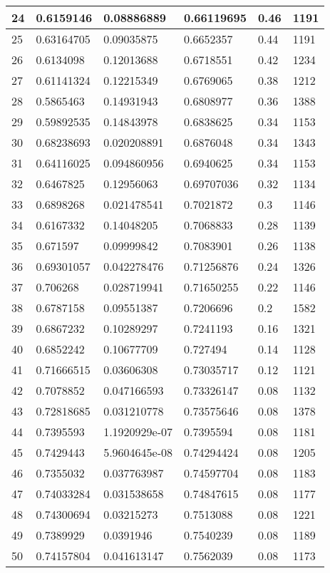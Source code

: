 \begin{longtable}{|l|l|l|l|l|l|}
24 & 0.6159146 & 0.08886889 & 0.66119695 & 0.46 & 1191 \\ \hline 
25 & 0.63164705 & 0.09035875 & 0.6652357 & 0.44 & 1191 \\ \hline 
26 & 0.6134098 & 0.12013688 & 0.6718551 & 0.42 & 1234 \\ \hline 
27 & 0.61141324 & 0.12215349 & 0.6769065 & 0.38 & 1212 \\ \hline 
28 & 0.5865463 & 0.14931943 & 0.6808977 & 0.36 & 1388 \\ \hline 
29 & 0.59892535 & 0.14843978 & 0.6838625 & 0.34 & 1153 \\ \hline 
30 & 0.68238693 & 0.020208891 & 0.6876048 & 0.34 & 1343 \\ \hline 
31 & 0.64116025 & 0.094860956 & 0.6940625 & 0.34 & 1153 \\ \hline 
32 & 0.6467825 & 0.12956063 & 0.69707036 & 0.32 & 1134 \\ \hline 
33 & 0.6898268 & 0.021478541 & 0.7021872 & 0.3 & 1146 \\ \hline 
34 & 0.6167332 & 0.14048205 & 0.7068833 & 0.28 & 1139 \\ \hline 
35 & 0.671597 & 0.09999842 & 0.7083901 & 0.26 & 1138 \\ \hline 
36 & 0.69301057 & 0.042278476 & 0.71256876 & 0.24 & 1326 \\ \hline 
37 & 0.706268 & 0.028719941 & 0.71650255 & 0.22 & 1146 \\ \hline 
38 & 0.6787158 & 0.09551387 & 0.7206696 & 0.2 & 1582 \\ \hline 
39 & 0.6867232 & 0.10289297 & 0.7241193 & 0.16 & 1321 \\ \hline 
40 & 0.6852242 & 0.10677709 & 0.727494 & 0.14 & 1128 \\ \hline 
41 & 0.71666515 & 0.03606308 & 0.73035717 & 0.12 & 1121 \\ \hline 
42 & 0.7078852 & 0.047166593 & 0.73326147 & 0.08 & 1132 \\ \hline 
43 & 0.72818685 & 0.031210778 & 0.73575646 & 0.08 & 1378 \\ \hline 
44 & 0.7395593 & 1.1920929e-07 & 0.7395594 & 0.08 & 1181 \\ \hline 
45 & 0.7429443 & 5.9604645e-08 & 0.74294424 & 0.08 & 1205 \\ \hline 
46 & 0.7355032 & 0.037763987 & 0.74597704 & 0.08 & 1183 \\ \hline 
47 & 0.74033284 & 0.031538658 & 0.74847615 & 0.08 & 1177 \\ \hline 
48 & 0.74300694 & 0.03215273 & 0.7513088 & 0.08 & 1221 \\ \hline 
49 & 0.7389929 & 0.0391946 & 0.7540239 & 0.08 & 1189 \\ \hline 
50 & 0.74157804 & 0.041613147 & 0.7562039 & 0.08 & 1173 \\ \hline 
\end{longtable}